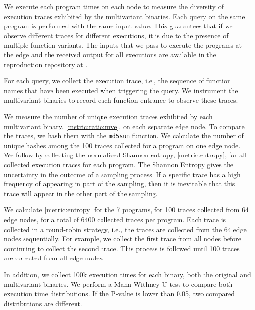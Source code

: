 We execute each program  times on each node to measure the diversity of execution traces exhibited by the multivariant binaries. Each query on the same program is performed with the same input value. This guarantees that if we observe different traces for different executions, it is due to the presence of multiple function variants. 
The inputs that we pass to execute the programs at the edge and the received output for all executions are available in the reproduction repository at . 

For each query, we collect the execution trace, i.e.,  the sequence of function names that have been executed when triggering the query.
We instrument the multivariant binaries to record each function entrance to observe these traces.

We measure the number of unique execution traces exhibited by each multivariant binary, \autoref{metric:ratio:mve}, on each separate edge node. To compare the traces, we hash them with the \texttt{md5sum} function.
We calculate the number of unique hashes among the 100 traces collected for a program on one edge node.
We follow by collecting the normalized Shannon entropy, \autoref{metric:entropy}, for all collected execution traces for each program.
The Shannon Entropy gives the uncertainty in the outcome of a sampling process.
If a specific trace has a high frequency of appearing in part of the sampling, then it is inevitable that this trace will appear in the other part of the sampling.


We calculate \autoref{metric:entropy} for the 7 programs, for 100 traces collected from 64 edge nodes, for a total of 6400 collected traces per program.
Each trace is collected in a round-robin strategy, i.e., the traces are collected from the 64 edge nodes sequentially.
For example, we collect the first trace from all nodes before continuing to collect the second trace.
This process is followed until 100 traces are collected from all edge nodes.


In addition, we collect 100k execution times for each binary, both the original and multivariant binaries.
We perform a Mann-Withney U test \cite{mann1947} to compare both execution time distributions. 
If the P-value is lower than 0.05, two compared distributions are different.
